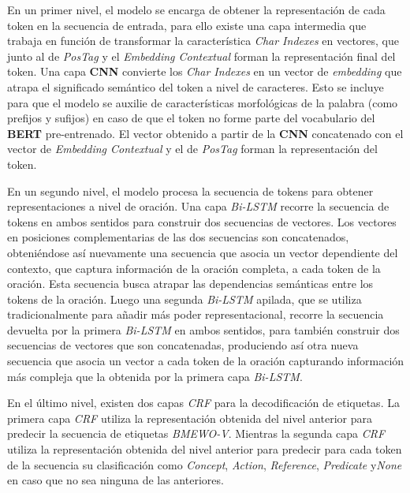 En un primer nivel, el modelo se encarga de obtener la representaci\'on de cada token en la secuencia de entrada, para ello existe una capa intermedia que trabaja en funci\'on de transformar la caracter\'istica \emph{Char Indexes} en vectores, que junto al de \emph{PosTag} y el \emph{Embedding Contextual} forman la representaci\'on final del token. Una capa \textbf{CNN} convierte los \emph{Char Indexes} en un vector de \emph{embedding} que atrapa el significado sem\'antico del token a nivel de caracteres. Esto se incluye para que el modelo se auxilie de caracter\'isticas morfol\'ogicas de la palabra (como prefijos y sufijos) en caso de que el token no forme parte del vocabulario del \textbf{BERT} pre-entrenado. El vector obtenido a partir de la \textbf{CNN} concatenado con el vector de \emph{Embedding Contextual} y el de \emph{PosTag} forman la representaci\'on del token.

En un segundo nivel, el modelo procesa la secuencia de tokens para obtener representaciones a nivel de oraci\'on. Una capa \emph{Bi-LSTM} recorre la secuencia de tokens en ambos sentidos para construir dos secuencias de vectores. Los vectores en posiciones complementarias de las dos secuencias son concatenados, obteni\'endose as\'i nuevamente una secuencia que asocia un vector dependiente del contexto, que captura informaci\'on de la oraci\'on completa, a cada token de la oraci\'on. Esta secuencia busca atrapar las dependencias semánticas entre los tokens de la oración.
Luego una segunda \emph{Bi-LSTM} apilada, que se utiliza tradicionalmente para a\~nadir m\'as poder representacional, recorre la secuencia devuelta por la primera \emph{Bi-LSTM} en ambos sentidos, para tambi\'en construir dos secuencias de vectores que son concatenadas, produciendo as\'i otra nueva secuencia que asocia un vector a cada token de la oraci\'on capturando informaci\'on m\'as compleja que la obtenida por la primera capa \emph{Bi-LSTM}.

En el \'ultimo nivel, existen dos capas \emph{CRF} para la decodificaci\'on de etiquetas. La primera capa \emph{CRF} utiliza la representaci\'on obtenida del nivel anterior para predecir la secuencia de etiquetas \emph{BMEWO-V}. Mientras la segunda capa \emph{CRF} utiliza la representaci\'on obtenida del nivel anterior para predecir para cada token de la secuencia su clasificaci\'on como \emph{Concept}, \emph{Action}, \emph{Reference}, \emph{Predicate} y\emph{None} en caso que no sea ninguna de las anteriores.

